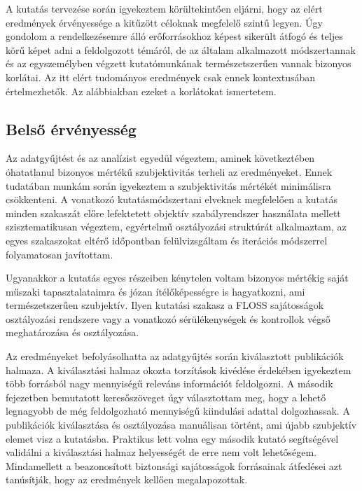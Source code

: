 \documentclass[12pt,magyar,a4paper,oneside]{scrreprt}
\begin{document}
A kutatás tervezése során igyekeztem körültekintően eljárni, hogy az
elért eredmények érvényessége a kitűzött céloknak megfelelő szintű
legyen. Úgy gondolom a rendelkezésemre álló erőforrásokhoz képest
sikerült átfogó és teljes körű képet adni a feldolgozott témáról, de az
általam alkalmazott módszertannak és az egyszemélyben végzett
kutatómunkának természetszerűen vannak bizonyos korlátai. Az itt elért
tudományos eredmények csak ennek kontextusában értelmezhetők. Az
alábbiakban ezeket a korlátokat ismertetem.

\hypertarget{belsux151-uxe9rvuxe9nyessuxe9g}{%
\subsection{Belső érvényesség}\label{belsux151-uxe9rvuxe9nyessuxe9g}}

Az adatgyűjtést és az analízist egyedül végeztem, aminek következtében
óhatatlanul bizonyos mértékű szubjektivitás terheli az eredményeket.
Ennek tudatában munkám során igyekeztem a szubjektivitás mértékét
minimálisra csökkenteni. A vonatkozó kutatásmódszertani elveknek
megfelelően a kutatás minden szakaszát előre lefektetett objektív
szabályrendszer használata mellett szisztematikusan végeztem, egyértelmű
osztályozási struktúrát alkalmaztam, az egyes szakaszokat eltérő
időpontban felülvizsgáltam és iterációs módszerrel folyamatosan
javítottam.

Ugyanakkor a kutatás egyes részeiben kénytelen voltam bizonyos mértékig
saját műszaki tapasztalataimra és józan ítélőképességre is hagyatkozni,
ami természetszerűen szubjektív. Ilyen kutatási szakasz a FLOSS
sajátosságok osztályozási rendszere vagy a vonatkozó sérülékenységek és
kontrollok végső meghatározása és osztályozása.

Az eredményeket befolyásolhatta az adatgyűjtés során kiválasztott
publikációk halmaza. A kiválasztási halmaz okozta torzítások kivédése
érdekében igyekeztem több forrásból nagy mennyiségű releváns információt
feldolgozni. A második fejezetben bemutatott keresőszöveget úgy
választottam meg, hogy a lehető legnagyobb de még feldolgozható
mennyiségű kiindulási adattal dolgozhassak. A publikációk kiválasztása
és osztályozása manuálisan történt, ami újabb szubjektív elemet visz a
kutatásba. Praktikus lett volna egy második kutató segítségével
validálni a kiválasztási halmaz helyességét de erre nem volt
lehetőségem. Mindamellett a beazonosított biztonsági sajátosságok
forrásainak átfedései azt tanúsítják, hogy az eredmények kellően
megalapozottak.
\end{document}
